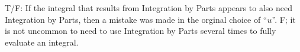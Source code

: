{T/F: If the integral that results from Integration by Parts appears to also need Integration by Parts, then a mistake was made in the orginal choice of ``$u$''.}
{F; it is not uncommon to need to use Integration by Parts several times to fully evaluate an integral.
}

